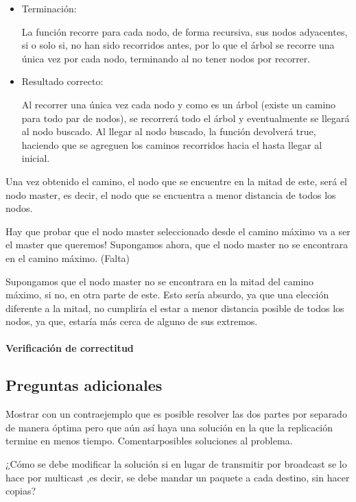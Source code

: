 \documentclass[a4paper, 10pt, twoside]{article}
\begin{document}
\begin{itemize}
\item Terminación:

La función recorre para cada nodo, de forma recursiva, sus nodos adyacentes, si o solo si, no han sido recorridos antes, por lo que el árbol se recorre una única vez por cada nodo, terminando al no tener nodos por recorrer.

\item  Resultado correcto:

Al recorrer una única vez cada nodo y como es un árbol (existe un camino para todo par de nodos), se recorrerá todo el árbol y eventualmente se llegará al nodo buscado. Al llegar al nodo buscado, la función devolverá true, haciendo que se agreguen los caminos recorridos hacia el hasta llegar al inicial.
\end{itemize}

Una vez obtenido el camino, el nodo que se encuentre en la mitad de este, será el nodo master, es decir, el nodo que se encuentra a menor distancia de todos los nodos.

Hay que probar que el nodo master seleccionado desde el camino máximo va a ser el master que queremos!
Supongamos ahora, que el nodo master no se encontrara en el camino máximo. (Falta)

Supongamos que el nodo master no se encontrara en la mitad del camino máximo, si no, en otra parte de este. Esto sería absurdo, ya que una elección diferente a la mitad, no cumpliría el estar a menor distancia posible de todos los nodos, ya que, estaría más cerca de alguno de sus extremos.

\paragraph{Verificación de correctitud}

\subsection{Preguntas adicionales}
Mostrar con un contraejemplo que es posible resolver las dos partes por separado de manera óptima pero que aún así haya una solución en la que la replicación termine en menos tiempo. Comentarposibles soluciones al problema.


¿Cómo se debe modificar la solución si en lugar de transmitir por broadcast se lo hace por
multicast ,es decir, se debe mandar un paquete a cada destino, sin hacer copias?
\end{document}
